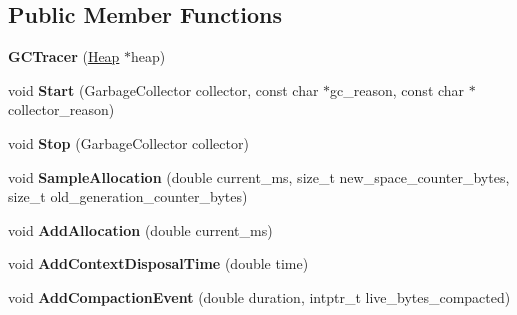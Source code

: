 \subsection*{Public Member Functions}
\begin{DoxyCompactItemize}
\item 
{\bfseries G\+C\+Tracer} (\hyperlink{classv8_1_1internal_1_1_heap}{Heap} $\ast$heap)\hypertarget{classv8_1_1internal_1_1_g_c_tracer_a79fdcc22e69a58ebe5db7f3a013f323e}{}\label{classv8_1_1internal_1_1_g_c_tracer_a79fdcc22e69a58ebe5db7f3a013f323e}

\item 
void {\bfseries Start} (Garbage\+Collector collector, const char $\ast$gc\+\_\+reason, const char $\ast$collector\+\_\+reason)\hypertarget{classv8_1_1internal_1_1_g_c_tracer_aba9eb8d33a24793c38fce6083510e9f3}{}\label{classv8_1_1internal_1_1_g_c_tracer_aba9eb8d33a24793c38fce6083510e9f3}

\item 
void {\bfseries Stop} (Garbage\+Collector collector)\hypertarget{classv8_1_1internal_1_1_g_c_tracer_a4c82602400b0339441c5134365cf4a8f}{}\label{classv8_1_1internal_1_1_g_c_tracer_a4c82602400b0339441c5134365cf4a8f}

\item 
void {\bfseries Sample\+Allocation} (double current\+\_\+ms, size\+\_\+t new\+\_\+space\+\_\+counter\+\_\+bytes, size\+\_\+t old\+\_\+generation\+\_\+counter\+\_\+bytes)\hypertarget{classv8_1_1internal_1_1_g_c_tracer_af89e3e4c9db41e5151ce30dd84c7e3de}{}\label{classv8_1_1internal_1_1_g_c_tracer_af89e3e4c9db41e5151ce30dd84c7e3de}

\item 
void {\bfseries Add\+Allocation} (double current\+\_\+ms)\hypertarget{classv8_1_1internal_1_1_g_c_tracer_a0e906f7c130822009e5f8703fe60d538}{}\label{classv8_1_1internal_1_1_g_c_tracer_a0e906f7c130822009e5f8703fe60d538}

\item 
void {\bfseries Add\+Context\+Disposal\+Time} (double time)\hypertarget{classv8_1_1internal_1_1_g_c_tracer_a425caf27264aab1b8fbe9c42f12944d3}{}\label{classv8_1_1internal_1_1_g_c_tracer_a425caf27264aab1b8fbe9c42f12944d3}

\item 
void {\bfseries Add\+Compaction\+Event} (double duration, intptr\+\_\+t live\+\_\+bytes\+\_\+compacted)\hypertarget{classv8_1_1internal_1_1_g_c_tracer_a0a303d3c084ed2ea08011d5760b979f7}{}\label{classv8_1_1internal_1_1_g_c_tracer_a0a303d3c084ed2ea08011d5760b979f7}


\end{DoxyCompactItemize}
